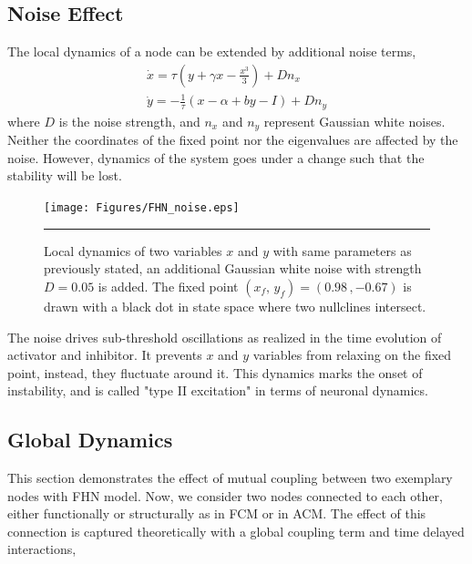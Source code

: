 \subsection{Noise Effect}

The local dynamics of a node can be extended by  additional noise terms, 
\begin{subequations}
\begin{align}\dot{x} = \tau (y + \gamma x - \frac{x^3}{3}) + Dn_x  \label{eqn: frobenius 12}\\  \dot{y} = -\frac{1}{\tau} (x - \alpha + b y - I ) + Dn_y \label{eqn: frobenius 13}   \end{align} 
\end{subequations}
where $D$ is the noise strength, and $n_x$ and $n_y$ represent Gaussian white noises. Neither the coordinates of the fixed point nor the eigenvalues are affected by the noise. However, dynamics of the system goes under a change such that the stability will be lost. 

\begin{figure}[htbp]
  \centering
	\texttt{[image: Figures/FHN\_noise.eps]}
 
    \rule{35em}{0.5pt}
    \caption[FHN Noise]{Local dynamics of two variables $x$ and  $y$ with same parameters as previously stated, an additional Gaussian white noise with strength $D=0.05$ is added. The fixed point $(x_f, \, y_f) = (0.98 \, , -0.67 )$ is drawn with a black dot in state space where two nullclines intersect.   }
  \label{fig:FHN Noise}	
\end{figure}

The noise drives sub-threshold oscillations as realized in the time evolution of activator and inhibitor. It prevents $x$ and $y$ variables from relaxing on the fixed point, instead, they fluctuate around it. This dynamics marks the onset of instability, and is called "type II excitation" in terms of neuronal dynamics. 


\subsection{Global Dynamics}

This section demonstrates the effect of mutual coupling between two exemplary nodes with FHN model. Now, we consider two nodes connected to each other, either functionally or structurally as in FCM or in ACM. The effect of this connection is captured theoretically with a global coupling term and time delayed interactions, 

